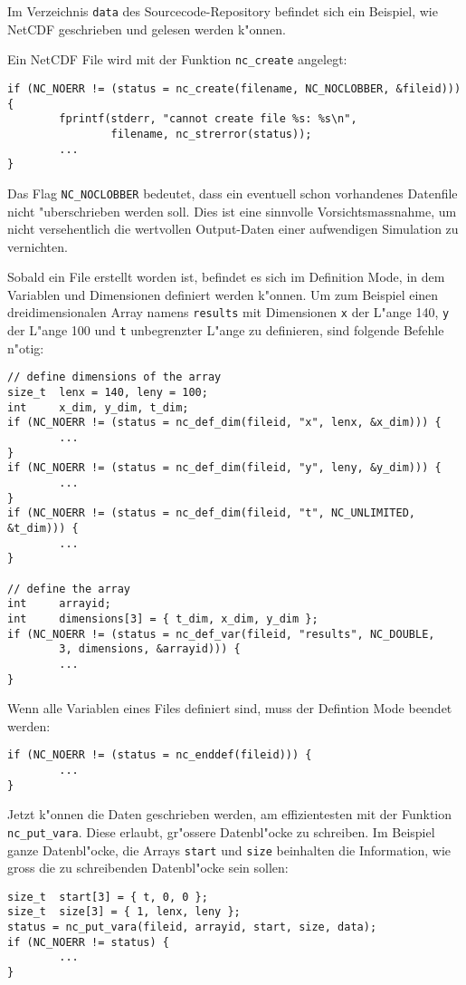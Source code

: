 \begin{beispiel}
Im Verzeichnis {\tt data} des Sourcecode-Repository befindet sich
ein Beispiel, wie NetCDF geschrieben und gelesen werden k"onnen.

Ein NetCDF File wird mit der Funktion \verb+nc_create+ angelegt:
\begin{verbatim}
if (NC_NOERR != (status = nc_create(filename, NC_NOCLOBBER, &fileid))) {
        fprintf(stderr, "cannot create file %s: %s\n",
                filename, nc_strerror(status));
        ...
}
\end{verbatim}
Das Flag \verb+NC_NOCLOBBER+ bedeutet, dass ein eventuell schon vorhandenes
Datenfile nicht "uberschrieben werden soll.
Dies ist eine sinnvolle Vorsichtsmassnahme, um nicht versehentlich
die wertvollen Output-Daten einer aufwendigen Simulation zu vernichten.

Sobald ein File erstellt worden ist, befindet es sich im Definition
Mode, in dem Variablen und Dimensionen definiert werden k"onnen.
Um zum Beispiel einen dreidimensionalen Array namens {\tt results}
mit Dimensionen {\tt x} der L"ange 140, {\tt y} der L"ange 100 und 
{\tt t} unbegrenzter L"ange zu definieren, sind folgende Befehle n"otig:
\begin{verbatim}
// define dimensions of the array
size_t  lenx = 140, leny = 100;
int     x_dim, y_dim, t_dim;
if (NC_NOERR != (status = nc_def_dim(fileid, "x", lenx, &x_dim))) {
        ...
}
if (NC_NOERR != (status = nc_def_dim(fileid, "y", leny, &y_dim))) {
        ...
}
if (NC_NOERR != (status = nc_def_dim(fileid, "t", NC_UNLIMITED, &t_dim))) {
        ...
}

// define the array
int     arrayid;
int     dimensions[3] = { t_dim, x_dim, y_dim };
if (NC_NOERR != (status = nc_def_var(fileid, "results", NC_DOUBLE,
        3, dimensions, &arrayid))) {
        ...
}
\end{verbatim}
Wenn alle Variablen eines Files definiert sind, muss der Defintion
Mode beendet werden:
\begin{verbatim}
if (NC_NOERR != (status = nc_enddef(fileid))) {
        ...
}
\end{verbatim}
Jetzt k"onnen die Daten geschrieben werden, am effizientesten mit der
Funktion \verb+nc_put_vara+. Diese erlaubt, gr"ossere Datenbl"ocke
zu schreiben.
Im Beispiel ganze Datenbl"ocke, die Arrays {\tt start} und {\tt size}
beinhalten die Information, wie gross die zu schreibenden Datenbl"ocke
sein sollen:
\begin{verbatim}
size_t  start[3] = { t, 0, 0 };
size_t  size[3] = { 1, lenx, leny };
status = nc_put_vara(fileid, arrayid, start, size, data);
if (NC_NOERR != status) {
        ...
}
\end{verbatim}
\end{beispiel}

